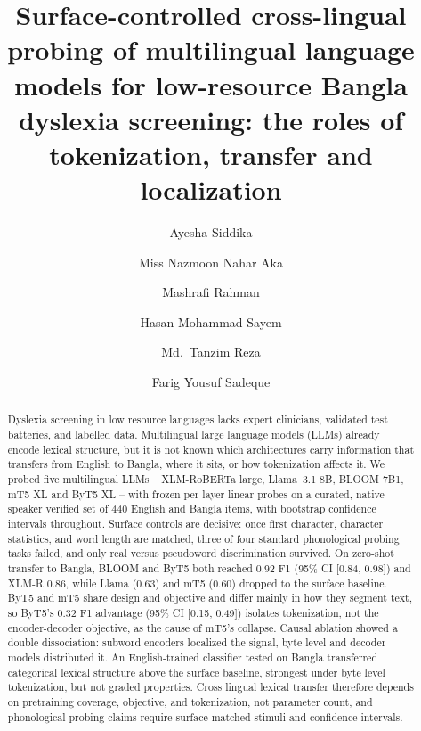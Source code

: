 \documentclass[preprint,12pt,authoryear]{elsarticle}
\begin{document}
\begin{frontmatter}

\title{Surface-controlled cross-lingual probing of multilingual language models for low-resource Bangla dyslexia screening: the roles of tokenization, transfer and localization}

\author[bracu]{Ayesha Siddika}
\author[bracu]{Miss Nazmoon Nahar Aka}
\author[bracu]{Mashrafi Rahman}
\author[bracu]{Hasan Mohammad Sayem}
\author[bracu]{Md.\ Tanzim Reza}
\author[bracu]{Farig Yousuf Sadeque}



\begin{abstract}
Dyslexia screening in low resource languages lacks expert clinicians, validated test batteries, and labelled data. Multilingual large language models (LLMs) already encode lexical structure, but it is not known which architectures carry information that transfers from English to Bangla, where it sits, or how tokenization affects it. We probed five multilingual LLMs -- XLM-RoBERTa large, Llama~3.1 8B, BLOOM 7B1, mT5 XL and ByT5 XL -- with frozen per layer linear probes on a curated, native speaker verified set of 440 English and Bangla items, with bootstrap confidence intervals throughout. Surface controls are decisive: once first character, character statistics, and word length are matched, three of four standard phonological probing tasks failed, and only real versus pseudoword discrimination survived. On zero-shot transfer to Bangla, BLOOM and ByT5 both reached 0.92 F1 (95\% CI [0.84, 0.98]) and XLM-R 0.86, while Llama (0.63) and mT5 (0.60) dropped to the surface baseline. ByT5 and mT5 share design and objective and differ mainly in how they segment text, so ByT5's 0.32 F1 advantage (95\% CI [0.15, 0.49]) isolates tokenization, not the encoder-decoder objective, as the cause of mT5's collapse. Causal ablation showed a double dissociation: subword encoders localized the signal, byte level and decoder models distributed it. An English-trained classifier tested on Bangla transferred categorical lexical structure above the surface baseline, strongest under byte level tokenization, but not graded properties. Cross lingual lexical transfer therefore depends on pretraining coverage, objective, and tokenization, not parameter count, and phonological probing claims require surface matched stimuli and confidence intervals.
\end{abstract}


\end{frontmatter}
\end{document}
